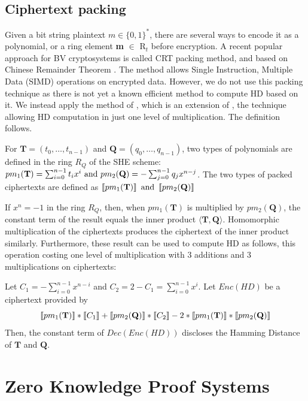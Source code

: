 \subsection{Ciphertext packing}
\label{sub:ciphertext_packing}
Given a bit string plaintext $m \in \{0,1\}^*$, there are several ways to encode it as a polynomial, or a ring element \textbf{m} $\in$ R$_{t}$ before
encryption. A recent popular approach for BV cryptosystems is called CRT packing
method, and based on Chinese Remainder Theorem \cite{smart2014fully}. The
method allows Single Instruction, Multiple Data (SIMD) operations on encrypted
data. However, we do not use this packing technique as there is not yet a known
efficient method to compute HD based on it. We instead apply the method of
\cite{yasuda2014practical}, which is an extension of \cite{naehrig2011can},
the technique allowing HD computation in just one level of multiplication. The
definition follows.
\begin{definition}
  For $\mathbf{T} = (t_0, \dots, t_{n-1})$ and
  $\mathbf{Q} = (q_0, \dots, q_{n-1})$, two types of polynomials are defined in
  the ring $R_Q$ of the SHE scheme:
  $ pm_1(\mathbf{T}) = \sum_{i=0}^{n-1}t_ix^i \ \textnormal{and} \
  pm_2(\mathbf{Q}) = - \sum_{j=0}^{n-1}q_jx^{n-j} $.  The two types of packed
  ciphertexts are defined as
  $ \left\llbracket pm_{1}(\mathbf{T})\right\rrbracket \textnormal{ and } \left\llbracket pm_2(\mathbf{Q})\right\rrbracket $
\end{definition}
If $x^n = -1$ in the ring $R_Q$, then, when $pm_1(\mathbf{T})$ is multiplied by
$pm_2(\mathbf{Q})$, the constant term of the result equals the inner product $\langle \mathbf{T}, \mathbf{Q}\rangle$. Homomorphic multiplication of the ciphertexts produces the ciphertext of the
inner product similarly. Furthermore, these result can be used to compute HD as
follows, this operation costing one level of multiplication with 3 additions and 3
multiplications on ciphertexts:

\begin{theorem}
  \label{theo:HDComputation}
  Let $C_1 = - \sum_{i=0}^{n-1}x^{n-i}$ and
  $C_2 = 2 - C_1 = \sum_{i=0}^{n-1}x^i$. Let $Enc(HD)$ be a ciphertext provided by
  \[
    \left\llbracket pm_{1}(\mathbf{T})\right\rrbracket*\left\llbracket C_1 \right\rrbracket + \left\llbracket pm_{2}(\mathbf{Q})\right\rrbracket*
    \left\llbracket C_2 \right\rrbracket - 2*\left\llbracket pm_{1}(\mathbf{T})\right\rrbracket*\left\llbracket pm_{2}(\mathbf{Q})\right\rrbracket
  \]
  Then, the constant term of $Dec(Enc(HD))$ discloses the Hamming Distance of
  $\mathbf{T}$ and $\mathbf{Q}$.
\end{theorem}
\section{Zero Knowledge Proof Systems}
\label{sec:defZKP}
